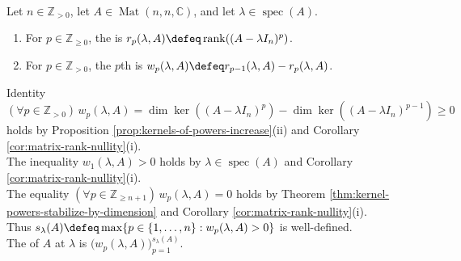 \begin{definition} \label{def:weyr-characteristic} \\
Let $n\in\mathbb{Z}_{>0}$, let $A\in\operatorname{Mat}(n,n,\mathbb{C})$, and let $\lambda\in\operatorname{spec}(A)$.
\begin{enumerate}[label=(\roman*)]
\setlength{\itemsep}{0pt}
\item For $p\in\mathbb{Z}_{\geq0}$, the  is $r_p(\lambda,A)\defeq\operatorname{rank}((A-\lambda I_n)^p)$.
\item For $p\in\mathbb{Z}_{>0}$, the $p$th  is $w_p(\lambda,A)\defeq r_{p-1}(\lambda,A)-r_p(\lambda,A)$.
\end{enumerate}
Identity $(\forall p\in\mathbb{Z}_{>0})\,w_p(\lambda,A)=\dim\ker((A-\lambda I_n)^p)-\dim\ker((A-\lambda I_n)^{p-1})\geq0$ holds by Proposition \ref{prop:kernels-of-powers-increase}(ii) and Corollary \ref{cor:matrix-rank-nullity}(i).\\
The inequality $w_1(\lambda,A)>0$ holds by $\lambda\in\operatorname{spec}(A)$ and Corollary \ref{cor:matrix-rank-nullity}(i).\\
The equality $(\forall p\in\mathbb{Z}_{\geq n+1})\,w_p(\lambda,A)=0$ holds by Theorem \ref{thm:kernel-powers-stabilize-by-dimension} and Corollary \ref{cor:matrix-rank-nullity}(i).\\
Thus $s_{\lambda}(A)\defeq\max\{p\in\{1,\ldots,n\}:w_p(\lambda,A)>0\}$ is well-defined.\\
The  of $A$ at $\lambda$ is $\bigl(w_p(\lambda,A)\bigr)_{p=1}^{s_{\lambda}(A)}$.
\end{definition}

